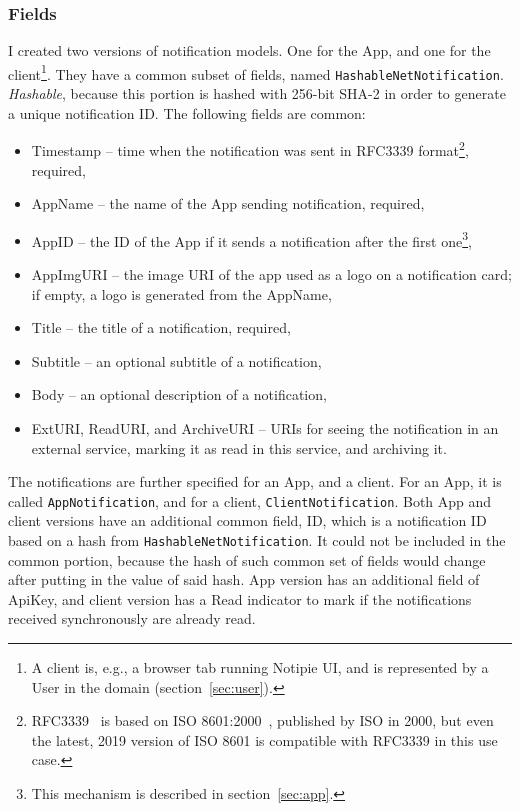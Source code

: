 \subsubsection{Fields}\label{sec:protocol-fields}

I created two versions of notification models.
One for the App,
and one for the client\footnote{
  A client is, e.g.,
  a browser tab running Notipie \ac{UI},
  and is represented
  by a User in the domain (section~\ref{sec:user}).
}.
They have a common subset of fields,
named \texttt{HashableNetNotification}.
\textit{Hashable},
because this portion is hashed with 256-bit \ac{SHA-2}
in order to generate a unique notification \ac{ID}.
The following fields are common:

\begin{itemize}
  \item Timestamp -- time when the notification was sent
        in RFC3339 format\footnote{
          RFC3339~\cite{clyne_rfc3339_2002} is based on
          ISO 8601:2000~\cite{international_organization_for_standardization_iso_2000},
          published by \ac{ISO} in 2000,
          but even the latest, 2019 version of ISO 8601
          is compatible with RFC3339 in this use case.
        }, required,
  \item AppName -- the name of the App sending notification, required,
  \item AppID -- the \ac{ID} of the App
        if it sends a notification after the first one\footnote{
          This mechanism is described in section~\ref{sec:app}.
        },
  \item AppImgURI -- the image \ac{URI} of the app
        used as a logo on a notification card;
        if empty, a logo is generated from the AppName,
  \item Title -- the title of a notification, required,
  \item Subtitle -- an optional subtitle of a notification,
  \item Body -- an optional description of a notification,
  \item ExtURI, ReadURI, and ArchiveURI -- \acp{URI}
        for seeing the notification in an external service,
        marking it as read in this service, and archiving it.
\end{itemize}

The notifications are further specified
for an App, and a client.
For an App, it is called \texttt{AppNotification},
and for a client, \texttt{ClientNotification}.
Both App and client versions
have an additional common field, \ac{ID},
which is a notification \ac{ID}
based on a hash from \texttt{HashableNetNotification}.
It could not be included in the common portion,
because the hash of such common set of fields
would change after putting in the value of said hash.
App version has an additional field of ApiKey,
and client version has a Read indicator
to mark if the notifications received
synchronously are already read.
